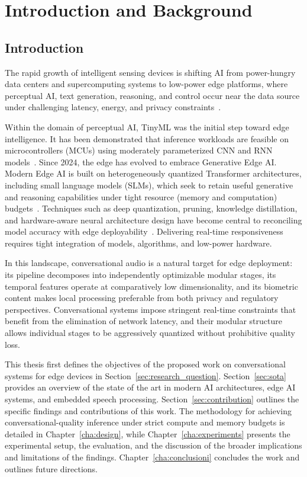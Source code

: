 \chapter{Introduction and Background}
\label{cha:intro}

\section{Introduction}
\label{sec:introduction}

The rapid growth of intelligent sensing devices is shifting AI from power-hungry
data centers and supercomputing systems to low-power edge platforms, where
perceptual AI, text generation, reasoning, and control occur near the data source
under challenging latency, energy, and privacy constraints~\cite{reddi2025generative}.

Within the domain of perceptual AI, TinyML was the initial step toward edge
intelligence. It has been demonstrated that inference workloads are feasible on
microcontrollers (MCUs) using moderately parameterized CNN and RNN
models~\cite{10177729,mi13060851}. Since 2024, the edge has evolved to embrace
Generative Edge AI. Modern Edge AI is built on heterogeneously quantized
Transformer architectures, including small language models (SLMs), which seek to
retain useful generative and reasoning capabilities under tight resource (memory
and computation) budgets~\cite{technologies12060081,electronics14173468}.
Techniques such as deep quantization, pruning, knowledge distillation, and
hardware-aware neural architecture design have become central to reconciling model
accuracy with edge deployability~\cite{s25103191}. Delivering real-time
responsiveness requires tight integration of models, algorithms, and low-power
hardware.

In this landscape, conversational audio is a natural target for edge deployment:
its pipeline decomposes into independently optimizable modular stages, its temporal
features operate at comparatively low dimensionality, and its biometric content
makes local processing preferable from both privacy and regulatory perspectives.
Conversational systems impose stringent real-time constraints that benefit from the
elimination of network latency, and their modular structure allows individual
stages to be aggressively quantized without prohibitive quality loss.

This thesis first defines the objectives of the proposed work on conversational
systems for edge devices in Section~\ref{sec:research_question}. Section~\ref{sec:sota}
provides an overview of the state of the art in modern AI architectures, edge AI
systems, and embedded speech processing. Section~\ref{sec:contribution} outlines the
specific findings and contributions of this work. The methodology for achieving
conversational-quality inference under strict compute and memory budgets is detailed
in Chapter~\ref{cha:design}, while Chapter~\ref{cha:experiments} presents the
experimental setup, the evaluation, and the discussion of the broader implications
and limitations of the findings. Chapter~\ref{cha:conclusioni} concludes the work
and outlines future directions.

